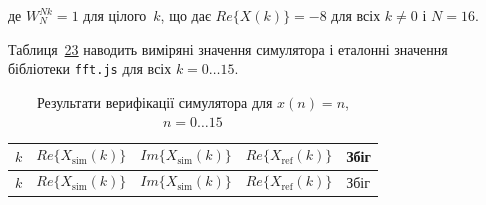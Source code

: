 де \(W_{N}^{Nk} = 1\) для цілого~\(k\), що дає \(Re\{ X(k)\} = - 8\) для
всіх \(k \neq 0\) і \(N = 16\).

Таблиця~\hyperref[tab:verify]{23} наводить виміряні значення симулятора
і еталонні значення бібліотеки \texttt{fft.js} для всіх
\(k = 0\ldots 15\).

\begin{longtable}[]{@{}
  >{\raggedright\arraybackslash}p{}
  >{\raggedright\arraybackslash}p{}
  >{\raggedright\arraybackslash}p{}
  >{\raggedright\arraybackslash}p{}
  >{\raggedright\arraybackslash}p{}@{}}
\caption{\protect{}\label{tab:verify}{}Результати
верифікації симулятора для \(x(n) = n\),
\(n = 0\ldots 15\)}\tabularnewline
\toprule\noalign{}
\begin{minipage}[b]{\linewidth}\raggedright
\[k\]
\end{minipage} & \begin{minipage}[b]{\linewidth}\raggedright
\[Re\{ X_{\text{sim}}(k)\}\]
\end{minipage} & \begin{minipage}[b]{\linewidth}\raggedright
\[Im\{ X_{\text{sim}}(k)\}\]
\end{minipage} & \begin{minipage}[b]{\linewidth}\raggedright
\[Re\{ X_{\text{ref}}(k)\}\]
\end{minipage} & \begin{minipage}[b]{\linewidth}\raggedright
Збіг
\end{minipage} \\
\midrule\noalign{}
\endfirsthead
\toprule\noalign{}
\begin{minipage}[b]{\linewidth}\raggedright
\[k\]
\end{minipage} & \begin{minipage}[b]{\linewidth}\raggedright
\[Re\{ X_{\text{sim}}(k)\}\]
\end{minipage} & \begin{minipage}[b]{\linewidth}\raggedright
\[Im\{ X_{\text{sim}}(k)\}\]
\end{minipage} & \begin{minipage}[b]{\linewidth}\raggedright
\[Re\{ X_{\text{ref}}(k)\}\]
\end{minipage} & \begin{minipage}[b]{\linewidth}\raggedright
Збіг
\end{minipage} \\

\end{longtable}
